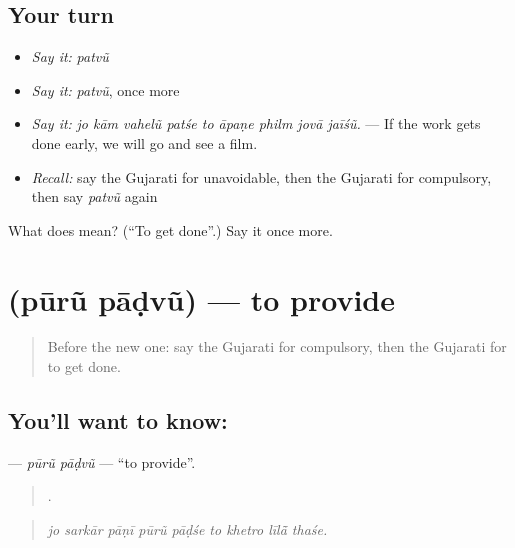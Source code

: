 \subsection*{Your turn}
\begin{itemize}
\raggedright
  \item \emph{Say it:} \emph{patvũ}
  \item \emph{Say it:} \emph{patvũ}, once more
  \item \emph{Say it:} \emph{jo kām vahelũ patśe to āpaṇe philm jovā jaīśũ.} — If the work gets done early, we will go and see a film.
  \item \emph{Recall:} say the Gujarati for unavoidable, then the Gujarati for compulsory, then say \emph{patvũ} again
\end{itemize}

\begin{tcolorbox}[breakable,colback=teal!4,colframe=teal!35!black,title={Before you move on}]
What does  mean? (\textquotedblleft{}To get done\textquotedblright{}.) Say it once more.
\end{tcolorbox}
\section[\texorpdfstring{\gu{પૂરું} \gu{પાડવું} (pūrũ pāḍvũ)}{પૂરું પાડવું (pūrũ pāḍvũ)}]{  (pūrũ pāḍvũ) — to provide}

\label{lesson:GU-C375-puru-padvu}



\begin{quote}
Before the new one: say the Gujarati for compulsory, then the Gujarati for to get done.
\end{quote}

\subsection*{You'll want to know:  }
\textbf{ } — \emph{pūrũ pāḍvũ} — \textquotedblleft{}to provide\textquotedblright{}.

\begin{quote}
        .
\end{quote}

\begin{quote}
\emph{jo sarkār pāṇī pūrũ pāḍśe to khetro līlā̃ thaśe.}
\end{quote}

